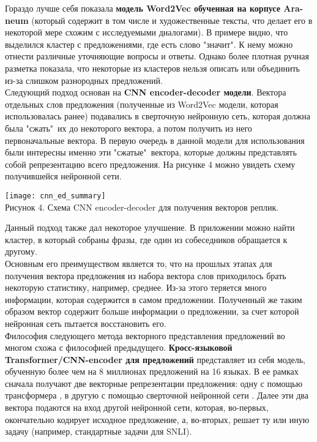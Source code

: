 \documentclass[a4paper,14pt]{article}
\begin{document}
\begin{justify}
\indent
Гораздо лучше себя показала \textbf{модель Word2Vec обученная на корпусе Ara-neum} (который содержит в том числе и художественные тексты, что делает его в некоторой мере схожим с исследуемыми диалогами). В примере видно, что выделился кластер с предложениями, где есть слово "значит". К нему можно отнести различные уточняющие вопросы и ответы. Однако более плотная ручная разметка показала, что некоторые из кластеров нельзя описать или объединить из-за слишком разнородных предложений. \\
\indent
Следующий подход основан на \textbf{CNN encoder-decoder модели}. Вектора отдельных слов предложения (полученные из Word2Vec модели, которая использовалась ранее) подавались в сверточную нейронную сеть, которая должна была "сжать"\ их до некоторого вектора, а потом получить из него первоначальные вектора. В первую очередь в данной модели для использования были интересны именно эти "сжатые"\ вектора, которые должны представлять собой репрезентацию всего предложения. На рисунке 4 можно увидеть схему получившейся нейронной сети.
\begin{center}
	\texttt{[image: cnn\_ed\_summary]}\\
	Рисунок 4. Схема CNN encoder-decoder для получения векторов реплик.
\end{center}
\indent
Данный подход также дал некоторое улучшение. В приложении можно найти кластер, в который собраны фразы, где один из собеседников обращается к другому. \\
\indent
Основным его преимуществом является то, что на прошлых этапах для получения вектора предложения из набора вектора слов приходилось брать некоторую статистику, например, среднее. Из-за этого теряется много информации, которая содержится в самом предложении. Полученный же таким образом вектор содержит больше информации о предложении, за счет которой нейронная сеть пытается восстановить его.\\
\indent
Философия следующего метода векторного представления предложений во многом схожа с философией предыдущего. \textbf{Кросс-языковой Transformer/CNN-encoder для предложений} представляет из себя модель, обученную более чем на 8 миллионах предложений на 16 языках. В ее рамках сначала получают две векторные репрезентации предложения: одну с помощью трансформера \cite{transformer}, в другую с помощью сверточной нейронной сети \cite{cnn}. Далее эти два вектора подаются на вход другой нейронной сети, которая, во-первых, окончательно кодирует исходное предложение, а, во-вторых, решает ту или иную задачу (например, стандартные задачи для SNLI\cite{snli}). \cite{tf-encoder-article} \\

\end{justify}
\end{document}
